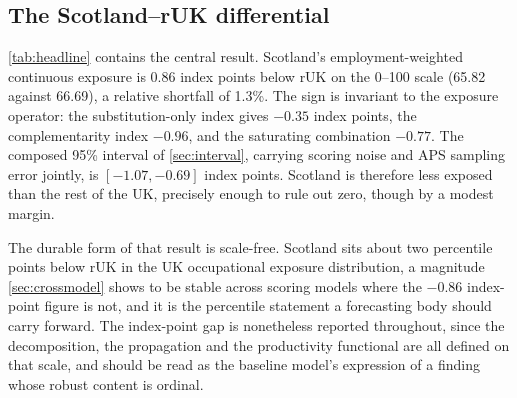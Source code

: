 \subsection{The Scotland--rUK differential}\label{sec:differential}
 
\cref{tab:headline} contains the central result. Scotland's employment-weighted continuous exposure is 0.86 index points below rUK on the 0--100 scale (65.82 against 66.69), a relative shortfall of 1.3\%. The sign is invariant to the exposure operator: the substitution-only index gives $-0.35$ index points, the complementarity index $-0.96$, and the saturating combination $-0.77$. The composed 95\% interval of \cref{sec:interval}, carrying scoring noise and APS sampling error jointly, is $[-1.07, -0.69]$ index points. Scotland is therefore less exposed than the rest of the UK, precisely enough to rule out zero, though by a modest margin.
 
The durable form of that result is scale-free. Scotland sits about two percentile points below rUK in the UK occupational exposure distribution, a magnitude \cref{sec:crossmodel} shows to be stable across scoring models where the $-0.86$ index-point figure is not, and it is the percentile statement a forecasting body should carry forward. The index-point gap is nonetheless reported throughout, since the decomposition, the propagation and the productivity functional are all defined on that scale, and should be read as the baseline model's expression of a finding whose robust content is ordinal.
 
